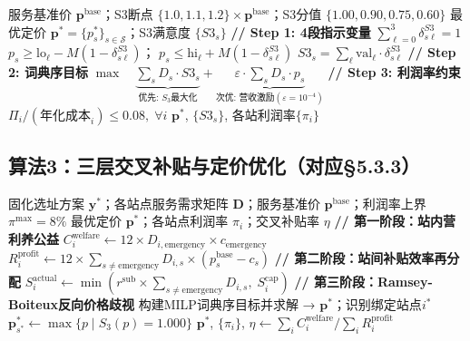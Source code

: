 \documentclass[12pt,a4paper]{ctexart}
\begin{document}
\begin{algorithm}[H]
\caption{定价优化S3满意度Big-M线性化}
\label{alg:s3_bigm}
\begin{algorithmic}[1]
\Require 服务基准价 $\mathbf{p}^{\text{base}}$；S3断点 $\{1.0, 1.1, 1.2\}\times\mathbf{p}^{\text{base}}$；S3分值 $\{1.00, 0.90, 0.75, 0.60\}$
\Ensure 最优定价 $\mathbf{p}^*=\{p_s^*\}_{s\in\mathcal{S}}$；S3满意度 $\{S3_s\}$
\State \textbf{// Step 1: 4段指示变量}
    \State $\sum_{\ell=0}^{3}\delta_{s\ell}^{S3}=1$ 
        \State $p_s\ge\text{lo}_\ell - M(1-\delta_{s\ell}^{S3})$； $p_s\le\text{hi}_\ell + M(1-\delta_{s\ell}^{S3})$
    \EndFor
    \State $S3_s=\sum_\ell \text{val}_\ell\cdot\delta_{s\ell}^{S3}$
\EndFor
\State \textbf{// Step 2: 词典序目标}
\State $\max \quad \underbrace{\sum_s D_s\cdot S3_s}_{\text{优先: }S_3\text{最大化}} + \underbrace{\varepsilon\cdot\sum_s D_s\cdot p_s}_{\text{次优: 营收激励}(\varepsilon=10^{-4})}$
\State \textbf{// Step 3: 利润率约束}
\State $\Pi_i/(\text{年化成本}_i)\le 0.08,\;\forall i$ 
\State \Return $\mathbf{p}^*$, $\{S3_s\}$, 各站利润率$\{\pi_i\}$
\end{algorithmic}
\end{algorithm}

\subsection*{算法3：三层交叉补贴与定价优化（对应§5.3.3）}

\begin{algorithm}[H]
\caption{三层交叉补贴算法}
\label{alg:cross_subsidy}
\begin{algorithmic}[1]
\Require 固化选址方案 $\mathbf{y}^*$；各站点服务需求矩阵 $\mathbf{D}$；服务基准价 $\mathbf{p}^{\text{base}}$；利润率上界 $\pi^{\max}=8\%$
\Ensure 最优定价 $\mathbf{p}^*$；各站点利润率 $\pi_i$；交叉补贴率 $\eta$
\State \textbf{// 第一阶段：站内营利养公益}
    \State $C^{\text{welfare}}_i \gets 12 \times D_{i,\text{emergency}} \times c_{\text{emergency}}$
    \State $R^{\text{profit}}_i \gets 12 \times \sum_{s \neq \text{emergency}} D_{i,s} \times (p^{\text{base}}_s - c_s)$
\EndFor
\State \textbf{// 第二阶段：站间补贴效率再分配}
    \State $S^{\text{actual}}_i \gets \min(r^{\text{sub}} \times \sum_{s \neq \text{emergency}} D_{i,s},\; S^{\text{cap}}_i)$
\EndFor
\State \textbf{// 第三阶段：Ramsey-Boiteux反向价格歧视}
\State 构建MILP词典序目标并求解 → $\mathbf{p}^*$；识别绑定站点$i^*$
    \State $\mathbf{p}^*_{s^*} \gets \max\{p \mid S_3(p) = 1.000\}$
\EndIf
\State \Return $\mathbf{p}^*$, $\{\pi_i\}$, $\eta \gets \sum_i C^{\text{welfare}}_i / \sum_i R^{\text{profit}}_i$
\end{algorithmic}
\end{algorithm}
\end{document}
